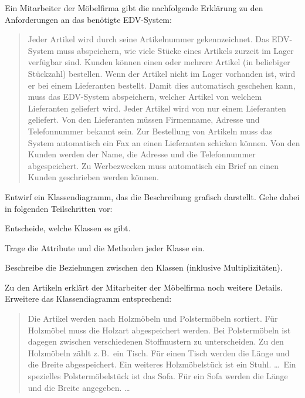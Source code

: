 \begin{compactenum}[a)]
\item Ein Mitarbeiter der Möbelfirma gibt die nachfolgende Erklärung zu den
Anforderungen an das benötigte EDV-System:

\begin{quotation}
\noindent Jeder Artikel wird durch seine Artikelnummer gekennzeichnet.
Das EDV-System muss abspeichern, wie viele Stücke eines Artikels zurzeit im
Lager verfügbar sind. Kunden können einen oder mehrere Artikel (in beliebiger
Stückzahl) bestellen. Wenn der Artikel nicht im Lager vorhanden ist, wird er
bei einem Lieferanten bestellt. Damit dies automatisch geschehen kann, muss das
EDV-System abspeichern, welcher Artikel von welchem Lieferanten geliefert wird.
Jeder Artikel wird von nur einem Lieferanten geliefert. Von den Lieferanten
müssen Firmenname, Adresse und Telefonnummer bekannt sein. Zur Bestellung von
Artikeln muss das System automatisch ein Fax an einen Lieferanten schicken
können. Von den Kunden werden der Name, die Adresse und die Telefonnummer
abgespeichert. Zu Werbezwecken muss automatisch ein Brief an einen Kunden
geschrieben werden können.
\end{quotation}

Entwirf ein Klassendiagramm, das die Beschreibung grafisch darstellt. Gehe
dabei in folgenden Teilschritten vor:

\begin{compactenum}[1.]
\item Entscheide, welche Klassen es gibt.
\item Trage die Attribute und die Methoden jeder Klasse ein.
\item Beschreibe die Beziehungen zwischen den Klassen (inklusive Multiplizitäten).
\end{compactenum}

\item Zu den Artikeln erklärt der Mitarbeiter der Möbelfirma noch weitere
Details. Erweitere das Klassendiagramm entsprechend:

\begin{quotation}
\noindent Die Artikel werden nach Holzmöbeln und Polstermöbeln sortiert. Für
Holzmöbel muss die Holzart abgespeichert werden. Bei Polstermöbeln ist dagegen
zwischen verschiedenen Stoffmustern zu unterscheiden. Zu den Holzmöbeln zählt
z.\,B.\ ein Tisch. Für einen Tisch werden die Länge und die Breite abgespeichert.
Ein weiteres Holzmöbelstück ist ein Stuhl. \ldots\ Ein spezielles
Polstermöbelstück ist das Sofa. Für ein Sofa werden die Länge und die Breite
angegeben. \ldots
\end{quotation}
\end{compactenum}



